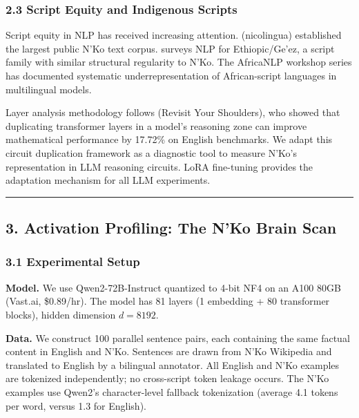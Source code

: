 \documentclass[
]{article}
\begin{document}
\subsubsection{2.3 Script Equity and Indigenous
Scripts}\label{script-equity-and-indigenous-scripts}

Script equity in NLP has received increasing attention.
\citet{doumbouya2021} (nicolingua) established the largest public N'Ko
text corpus. \citet{tonja2023natural} surveys NLP for Ethiopic/Ge'ez, a
script family with similar structural regularity to N'Ko. The AfricaNLP
workshop series has documented systematic underrepresentation of
African-script languages in multilingual models.

Layer analysis methodology follows \citet{ng2024rys} (Revisit Your
Shoulders), who showed that duplicating transformer layers in a model's
reasoning zone can improve mathematical performance by 17.72\% on
English benchmarks. We adapt this circuit duplication framework as a
diagnostic tool to measure N'Ko's representation in LLM reasoning
circuits. LoRA fine-tuning \cite{hu2022lora} provides the adaptation
mechanism for all LLM experiments.

\begin{center}\rule{0.5\linewidth}{0.5pt}\end{center}

\subsection{3. Activation Profiling: The N'Ko Brain
Scan}\label{activation-profiling-the-nko-brain-scan}

\subsubsection{3.1 Experimental Setup}\label{experimental-setup}

\textbf{Model.} We use Qwen2-72B-Instruct quantized to 4-bit NF4 on an
A100 80GB (Vast.ai, \$0.89/hr). The model has 81 layers (1 embedding +
80 transformer blocks), hidden dimension \(d = 8192\).

\textbf{Data.} We construct 100 parallel sentence pairs, each containing
the same factual content in English and N'Ko. Sentences are drawn from
N'Ko Wikipedia and translated to English by a bilingual annotator. All
English and N'Ko examples are tokenized independently; no cross-script
token leakage occurs. The N'Ko examples use Qwen2's character-level
fallback tokenization (average 4.1 tokens per word, versus 1.3 for
English).
\end{document}
